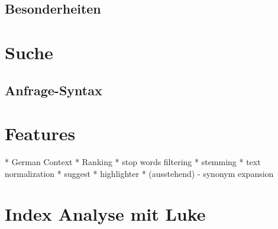 \subsection{Besonderheiten}


\section{Suche}
\subsection{Anfrage-Syntax}

\section{Features}

* German Context
* Ranking
* stop words filtering
* stemming
* text normalization
* suggest
* highlighter
* (ausstehend) - synonym expansion

\section{Index Analyse mit Luke}
